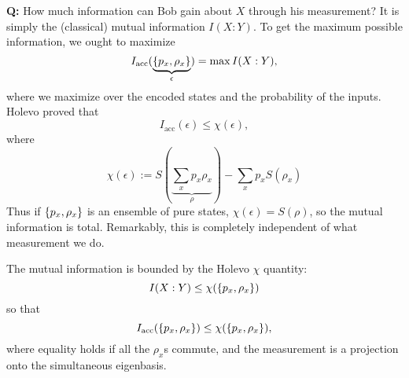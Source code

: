 \textbf{Q:} How much information can Bob gain about $X$ through his measurement? It is simply the (classical) mutual information $I(X:Y)$. To get the maximum possible information, we ought to maximize
\begin{equation}
    I_\text{acc}(\underbrace{\{p_x,\rho_x\}}_\epsilon) = \max I(X:Y),
\end{equation}
where we maximize over the encoded states and the probability of the inputs. Holevo proved that
\begin{equation}
    I_\text{acc}(\epsilon) \leq \chi(\epsilon),
\end{equation}
where
\begin{equation}
    \chi(\epsilon):= S(\underbrace{\sum_x p_x \rho_x}_\rho) - \sum_x p_x S(\rho_x)
\end{equation}
Thus if $\{p_x,\rho_x\}$ is an ensemble of pure states, $\chi(\epsilon)=S(\rho)$, so the mutual information is total. Remarkably, this is completely independent of what measurement we do.
\begin{thm}
    The mutual information is bounded by the Holevo $\chi$ quantity:
    \begin{equation}
        I(X:Y)\leq \chi(\{p_x,\rho_x\})
    \end{equation}
    so that
    \begin{equation}
        I_\text{acc}(\{p_x,\rho_x\})\leq \chi(\{p_x,\rho_x\}),
    \end{equation}
    where equality holds if all the $\rho_x$s commute, and the measurement is a projection onto the simultaneous eigenbasis.
\end{thm}
